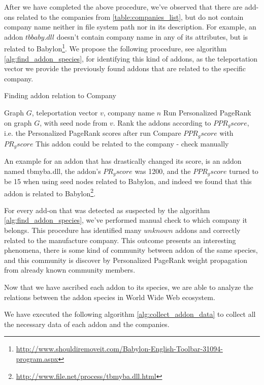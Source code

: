 \documentclass[11pt,oneside]{book}
\begin{document}
After we have completed the above procedure, we've observed that there are add-ons related to the companies from \autoref{table:companies_list}, but do not contain company name neither in file system path nor in its description. For example, an addon $tbbaby.dll$ doesn't contain company name in any of its attributes, but is related to Babylon\footnote{\url{http://www.shouldiremoveit.com/Babylon-English-Toolbar-31094-program.aspx}}. 
We propose the following procedure, see algorithm \autoref{alg:find_addon_species}, for identifying this kind of addons, as the teleportation vector we provide the previously found addons that are related to the specific company.

\begin{algorithm}[!t]
\caption{Finding addon relation to Company}
\label{alg:find_addon_species}
\begin{algorithmic}[1] 
\REQUIRE Graph $G$, teleportation vector $v$, company name $n$
\STATE Run Personalized PageRank on graph $G$, with seed node from $v$.
\STATE Rank the addons according to $PPR_gscore$, i.e. the Personalized PageRank scores after run
\STATE Compare $PPR_gscore$ with $PR_gscore$
\STATE This addon could be related to the company - check manually
\ENDIF
\ENDFOR
\end{algorithmic}
\end{algorithm}
An example for an addon that has drastically changed its score, is an addon named tbmyba.dll, the addon's $PR_gscore$ was 1200, and the $PPR_gscore$ turned to be 15 when using seed nodes related to Babylon, and indeed we found that this addon is related to Babylon\footnote{\url{http://www.file.net/process/tbmyba.dll.html}}.

For every add-on that was detected as suspected by the algorithm \autoref{alg:find_addon_species}, we've performed manual check to which company it belongs. This procedure has identified many $unknown$ addons and correctly related to the manufacture company. This outcome presents an interesting phenomena, there is some kind of community between addon of the same species, and this community is discover by Personalized PageRank weight propagation from already known community members.

Now that we have ascribed each addon to its species, we are able to analyze the relations between the addon species in World Wide Web ecosystem.

We have executed the following algorithm \autoref{alg:collect_addon_data} to collect all the necessary data of each addon and the companies.
\end{document}
